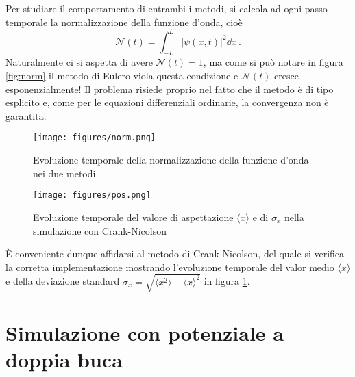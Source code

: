 \documentclass[a4paper, titlepage]{article}
\begin{document}
Per studiare il comportamento di entrambi i metodi, si calcola ad ogni passo temporale la normalizzazione della funzione d'onda, cioè
\[
    \mathcal{N}(t) = \int_{-L}^L |\psi(x,t)|^2 \dd{x}\, .
\]
Naturalmente ci si aspetta di avere $\mathcal{N}(t) = 1$, ma come si può notare in figura \ref{fig:norm} il metodo di Eulero viola questa condizione e $\mathcal{N}(t)$ cresce esponenzialmente!
Il problema risiede proprio nel fatto che il metodo è di tipo esplicito e, come per le equazioni differenziali ordinarie, la convergenza non è garantita. 

\begin{figure}[h!]
    \centering
    \begin{minipage}{0.47 \textwidth}
        \centering
        \texttt{[image: figures/norm.png]}
        \caption{Evoluzione temporale della normalizzazione della funzione d'onda nei due metodi}
        \label{fig:norm}
    \end{minipage}
    \hspace{0.02\textwidth}
    \begin{minipage}{0.47 \textwidth}
        \centering
        \texttt{[image: figures/pos.png]}
        \caption{Evoluzione temporale del valore di aspettazione $\langle x \rangle$ e di $\sigma_x$ nella simulazione con Crank-Nicolson}
        \label{fig:pos}
    \end{minipage}
\end{figure}

È conveniente dunque affidarsi al metodo di Crank-Nicolson, del quale si verifica la corretta implementazione mostrando l'evoluzione temporale del valor medio $\langle x \rangle$ e della deviazione standard $\sigma_x = \sqrt{\langle x^2 \rangle - \langle x \rangle^2}$ in figura \ref{fig:pos}.



\section{Simulazione con potenziale a doppia buca}
\end{document}
